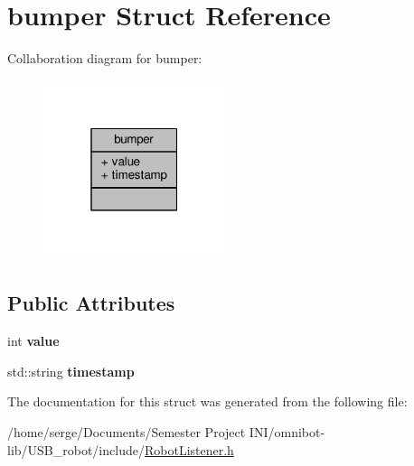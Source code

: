\hypertarget{structbumper}{}\section{bumper Struct Reference}
\label{structbumper}


Collaboration diagram for bumper\+:
\nopagebreak
\begin{figure}[H]
\begin{center}
\leavevmode
\includegraphics[width=151pt]{structbumper__coll__graph}
\end{center}
\end{figure}
\subsection*{Public Attributes}
\begin{DoxyCompactItemize}
\item 
\hypertarget{structbumper_a9fe58ba8100dac5c734c407545775300}{}int {\bfseries value}\label{structbumper_a9fe58ba8100dac5c734c407545775300}

\item 
\hypertarget{structbumper_a42639a9ad64823671784c081e527019e}{}std\+::string {\bfseries timestamp}\label{structbumper_a42639a9ad64823671784c081e527019e}

\end{DoxyCompactItemize}


The documentation for this struct was generated from the following file\+:\begin{DoxyCompactItemize}
\item 
/home/serge/\+Documents/\+Semester Project I\+N\+I/omnibot-\/lib/\+U\+S\+B\+\_\+robot/include/\hyperlink{_robot_listener_8h}{Robot\+Listener.\+h}\end{DoxyCompactItemize}
